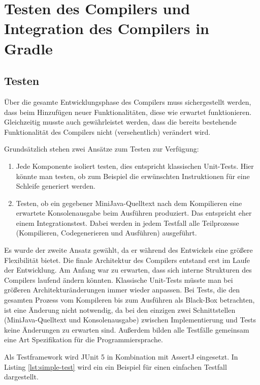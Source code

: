 \chapter{Testen des Compilers und Integration des Compilers in Gradle}
\label{cha:Testen-des-Compilers}

\section{Testen}

Über die gesamte Entwicklungsphase des Compilers muss sichergestellt werden, dass beim Hinzufügen neuer Funktionalitäten, diese wie erwartet funktionieren. Gleichzeitig musste auch gewährleistet werden, dass die bereits bestehende Funktionalität des Compilers nicht (versehentlich) verändert wird.

Grundsätzlich stehen zwei Ansätze zum Testen zur Verfügung:
\begin{enumerate}
    \item Jede Komponente isoliert testen, dies entspricht klassischen Unit-Tests. Hier könnte man testen, ob zum Beispiel die erwünschten Instruktionen für eine Schleife generiert werden. 
    \item Testen, ob ein gegebener MiniJava-Quelltext nach dem Kompilieren eine erwartete Konsolenausgabe beim Ausführen produziert. Das entspricht eher einem Integrationstest. Dabei werden in jedem Testfall alle Teilprozesse (Kompilieren, Codegenerieren und Ausführen) ausgeführt.
\end{enumerate}

Es wurde der zweite Ansatz gewählt, da er während des Entwickels eine größere Flexibilität bietet. Die finale Architektur des Compilers entstand erst im Laufe der Entwicklung. Am Anfang war zu erwarten, dass sich interne Strukturen des Compilers laufend ändern könnten. Klassische Unit-Tests müsste man bei größeren Architekturänderungen immer wieder anpassen. Bei Tests, die den gesamten Prozess vom Kompileren bis zum Ausführen als Black-Box betrachten, ist eine Änderung nicht notwendig, da bei den einzigen zwei Schnittstellen (MiniJava-Quelltext und Konsolenausgabe) zwischen Implementierung und Tests keine Änderungen zu erwarten sind. Außerdem bilden alle Testfälle gemeinsam eine Art Spezifikation für die Programmiersprache.

Als Testframework wird JUnit 5 \cite{JUnit} in Kombination mit AssertJ \cite{AssertJ} eingesetzt. In Listing \ref{lst:simple-test} wird ein ein Beispiel für einen einfachen Testfall dargestellt.

